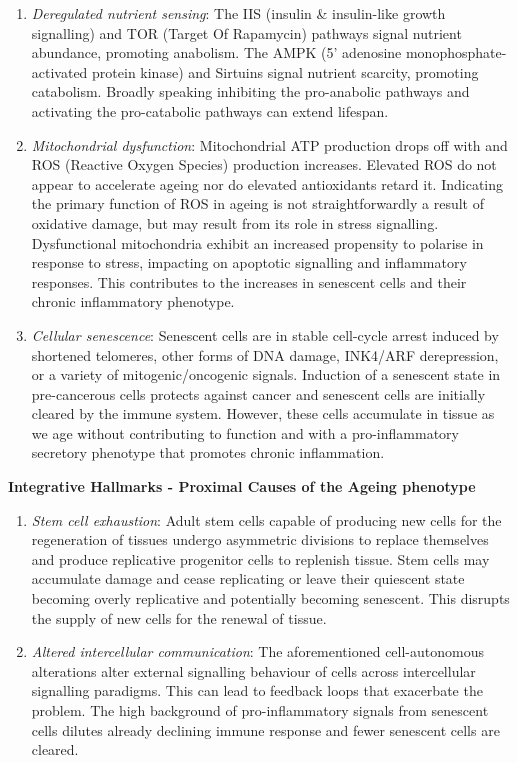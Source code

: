 \documentclass[
]{book}
\begin{document}
\begin{enumerate}
\def\labelenumi{\arabic{enumi}.}
\setcounter{enumi}{4}
\item
  \emph{Deregulated nutrient sensing}:
  The IIS (insulin \& insulin-like growth signalling) and TOR (Target Of Rapamycin) pathways signal nutrient abundance, promoting anabolism.
  The AMPK (5' adenosine monophosphate-activated protein kinase) and Sirtuins signal nutrient scarcity, promoting catabolism.
  Broadly speaking inhibiting the pro-anabolic pathways and activating the pro-catabolic pathways can extend lifespan.
\item
  \emph{Mitochondrial dysfunction}:
  Mitochondrial ATP production drops off with and ROS (Reactive Oxygen Species) production increases. Elevated ROS do not appear to accelerate ageing nor do elevated antioxidants retard it.
  Indicating the primary function of ROS in ageing is not straightforwardly a result of oxidative damage, but may result from its role in stress signalling.
  Dysfunctional mitochondria exhibit an increased propensity to polarise in response to stress, impacting on apoptotic signalling and inflammatory responses.
  This contributes to the increases in senescent cells and their chronic inflammatory phenotype.
\item
  \emph{Cellular senescence}:
  Senescent cells are in stable cell-cycle arrest induced by shortened telomeres, other forms of DNA damage, INK4/ARF derepression, or a variety of mitogenic/oncogenic signals.
  Induction of a senescent state in pre-cancerous cells protects against cancer and senescent cells are initially cleared by the immune system.
  However, these cells accumulate in tissue as we age without contributing to function and with a pro-inflammatory secretory phenotype that promotes chronic inflammation.
\end{enumerate}

\textbf{Integrative Hallmarks - Proximal Causes of the Ageing phenotype}

\begin{enumerate}
\def\labelenumi{\arabic{enumi}.}
\setcounter{enumi}{7}
\item
  \emph{Stem cell exhaustion}:
  Adult stem cells capable of producing new cells for the regeneration of tissues undergo asymmetric divisions to replace themselves and produce replicative progenitor cells to replenish tissue.
  Stem cells may accumulate damage and cease replicating or leave their quiescent state becoming overly replicative and potentially becoming senescent.
  This disrupts the supply of new cells for the renewal of tissue.
\item
  \emph{Altered intercellular communication}:
  The aforementioned cell-autonomous alterations alter external signalling behaviour of cells across intercellular signalling paradigms.
  This can lead to feedback loops that exacerbate the problem. The high background of pro-inflammatory signals from senescent cells dilutes already declining immune response and fewer senescent cells are cleared.
\end{enumerate}
\end{document}
